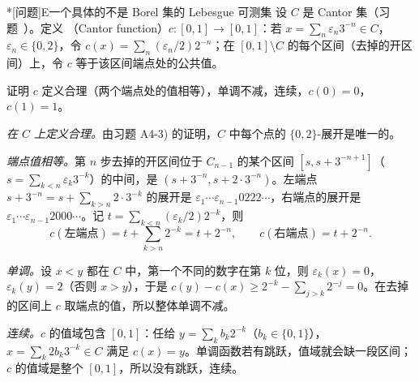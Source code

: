 \begin{probleme}*[问题]{E}{一个具体的不是 Borel 集的 Lebesgue 可测集}
设 $C$ 是 Cantor 集（习题~）。定义 （Cantor function）$c:[0,1]\to[0,1]$：若 $x=\sum_n\varepsilon_n3^{-n}\in C$，$\varepsilon_n\in\{0,2\}$，令 $c(x)=\sum_n(\varepsilon_n/2)2^{-n}$；在 $[0,1]\setminus C$ 的每个区间（去掉的开区间）上，令 $c$ 等于该区间端点处的公共值。
\begin{questions}
\item 证明 $c$ 定义合理（两个端点处的值相等），单调不减，连续，$c(0)=0$，$c(1)=1$。
\begin{solution}
\emph{在 $C$ 上定义合理。}由习题 A4-3) 的证明，$C$ 中每个点的 $\{0,2\}$-展开是唯一的。

\emph{端点值相等。}第 $n$ 步去掉的开区间位于 $C_{n-1}$ 的某个区间 $[s,s+3^{-n+1}]$（$s=\sum_{k<n}\varepsilon_k3^{-k}$）的中间，是 $(s+3^{-n},s+2\cdot3^{-n})$。左端点 $s+3^{-n}=s+\sum_{k>n}2\cdot3^{-k}$ 的展开是 $\varepsilon_1\cdots\varepsilon_{n-1}0222\cdots$，右端点的展开是 $\varepsilon_1\cdots\varepsilon_{n-1}2000\cdots$。记 $t=\sum_{k<n}(\varepsilon_k/2)2^{-k}$，则
\[
c(\text{左端点})=t+\sum_{k>n}2^{-k}=t+2^{-n},\qquad c(\text{右端点})=t+2^{-n}.
\]

\emph{单调。}设 $x<y$ 都在 $C$ 中，第一个不同的数字在第 $k$ 位，则 $\varepsilon_k(x)=0$，$\varepsilon_k(y)=2$（否则 $x>y$），于是 $c(y)-c(x)\geqslant2^{-k}-\sum_{j>k}2^{-j}=0$。在去掉的区间上 $c$ 取端点的值，所以整体单调不减。

\emph{连续。}$c$ 的值域包含 $[0,1]$：任给 $y=\sum_kb_k2^{-k}$（$b_k\in\{0,1\}$），$x=\sum_k2b_k3^{-k}\in C$ 满足 $c(x)=y$。单调函数若有跳跃，值域就会缺一段区间；$c$ 的值域是整个 $[0,1]$，所以没有跳跃，连续。


\end{solution}
\end{questions}
\end{probleme}
